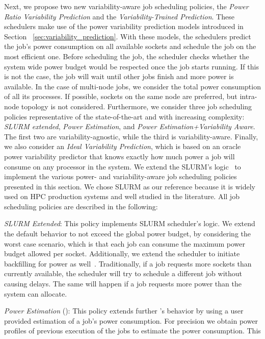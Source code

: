 
Next, we propose two new variability-aware job scheduling policies, the \textit{Power
Ratio Variability Prediction} and the \textit{Variability-Trained Prediction}. These
schedulers make use of the power variability prediction models introduced in Section
~\ref{sec:variability_prediction}. With these models, the schedulers predict the job's
power consumption on all available sockets and schedule the job on the most efficient one.
Before scheduling the job, the scheduler checks whether the system wide power budget would
be respected once the job starts running. If this is not the case, the job will wait until
other jobs finish and more power is available. In the case of multi-node jobs, we consider 
the total power consumption of all its processes.  If possible, sockets on the same node
are preferred, but intra-node topology is not considered.  
Furthermore, we consider three job scheduling policies representative of the
state-of-the-art and with increasing complexity: \textit{SLURM extended}, \textit{Power
Estimation}, and \textit{Power Estimation+Variability Aware}.  The first two are
variability-agnostic, while the third is variability-aware.  Finally, we also consider an
\textit{Ideal Variability Prediction}, which is based on an oracle power variability
predictor that knows exactly how much power a job will consume on any processor in the
system.  We extend the SLURM's logic~\cite{slurm_02} to implement the various power- and
variability-aware job scheduling policies presented in this section. We chose SLURM as our
reference because it is widely used on HPC production systems and well studied in the
literature.  All job scheduling policies are described in the following:
\par
\textit{SLURM Extended}: This policy implements SLURM scheduler's logic.  We extend the
default behavior to not exceed the global power budget, by considering the worst case
scenario, which is that each job can consume the maximum power budget allowed per socket.
Additionally, we extend the scheduler to initiate backfilling for power as
well~\cite{Patki:2015:PRM:2749246.2749262}.  Traditionally, if a job requests more sockets
than currently available, the scheduler will try to schedule a different job without
causing delays.  The same will happen if a job requests more power than the system can
allocate.
\par
\textit{Power Estimation} (\PESched): This policy extends further \DefaultSched's behavior
by using a user provided estimation of a job's power consumption.  For precision we obtain
power profiles of previous execution of the jobs to estimate the power consumption.  This
